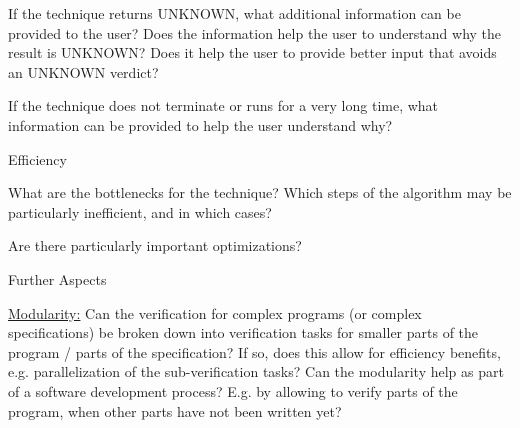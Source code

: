 \documentclass[a4paper]{article}
\begin{document}
\begin{minipage}[t]{0.16\linewidth}
\begin{betterlist}
\begin{betterlist}
			\item If the technique returns UNKNOWN, what additional information can be provided to the user? Does the information help the user to understand why the result is UNKNOWN? Does it help the user to provide better input that avoids an UNKNOWN verdict?

			\item If the technique does not terminate or runs for a very long time, what information can be provided to help the user understand why?

		\end{betterlist}
		\item \alert{Efficiency}
		\begin{betterlist}
			\item What are the bottlenecks for the technique? Which steps of the algorithm may be particularly inefficient, and in which cases?

			\item Are there particularly important optimizations?

		\end{betterlist}
		\item \alert{Further Aspects}
		\begin{betterlist}
			\item \underline{Modularity:} Can the verification for complex programs (or complex specifications) be broken down into verification tasks for smaller parts of the program / parts of the specification? If so, does this allow for efficiency benefits, e.g. parallelization of the sub-verification tasks? Can the modularity help as part of a software development process? E.g. by allowing to verify parts of the program, when other parts have not been written yet?


\end{betterlist}
\end{betterlist}
\end{minipage}
\end{document}
